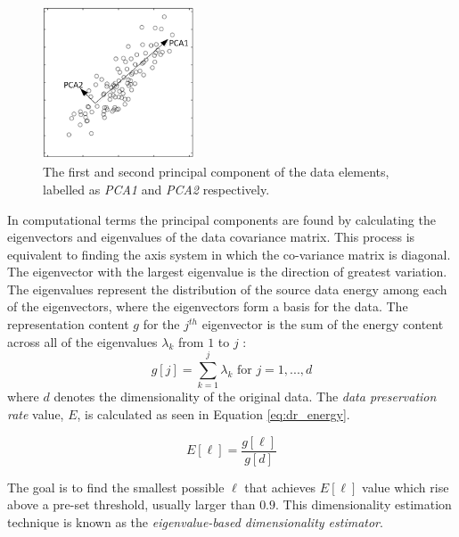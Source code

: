 \begin{figure}
\centering
\includegraphics[width=0.4\textwidth]{./figures/pca_demo}       
\caption{The first and second principal component of the data elements, labelled as \emph{PCA1} and \emph{PCA2 }respectively.}
\label{fig:pca_demo}
\end{figure}

\iftoggle{edit-mode}{\hspace{0pt}\marginpar{PCA formulation}}{}
In computational terms the principal components are found by calculating the eigenvectors and eigenvalues of the data covariance matrix. 
This process is equivalent to finding the axis system in which the co-variance matrix is diagonal. 
The eigenvector with the largest eigenvalue is the direction of greatest variation. 
The eigenvalues represent the distribution of the source data energy among each of the eigenvectors, where the eigenvectors form a basis for the data. 
The representation content $g$ for the $j^{th}$ eigenvector is the sum of the energy content across all of the eigenvalues $\lambda_k$ from $1$ to $j$ :
\begin{equation}
g[j]=\sum_{k=1}^{j}\lambda_k \text{          for   } j=1,...,d
\end{equation}
where $d$ denotes the dimensionality of the original data. 
The \emph{data preservation rate} value, $E$, is calculated as seen in Equation \ref{eq:dr_energy}. 

\begin{equation}
E[\ell] = \frac{g[\ell]}{g[d]}
\label{eq:dr_energy} 
\end{equation} 

The goal is to find the smallest possible $\ell$ that achieves $E[\ell]$ value which rise above a pre-set threshold, usually larger than $0.9$. 
This dimensionality estimation technique is known as the \emph{eigenvalue-based dimensionality estimator}. 


